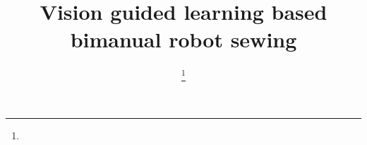 \documentclass[letterpaper, 10 pt, conference]{ieeeconf}  %
\title{\LARGE \bf
{Vision guided learning based bimanual robot sewing}
}
\author{
\thanks{}
}
\begin{document}
\maketitle
\thispagestyle{empty}
\pagestyle{empty}

\begin{abstract}

\end{abstract}






%




\end{document}

